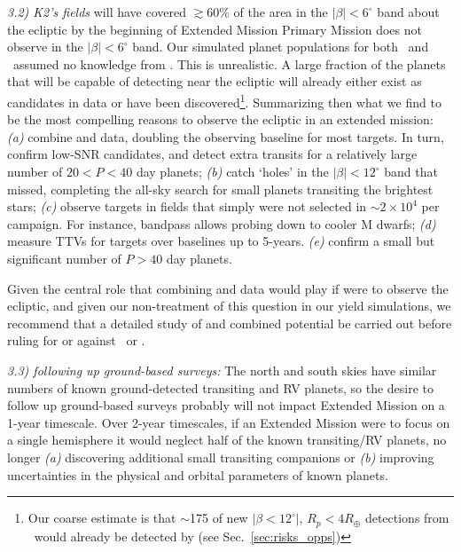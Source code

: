 \textit{3.2) K2's fields} will have covered $\gtrsim\!60\%$ of the area in the $|\beta|<6^\circ$ band about the ecliptic by the beginning of \tesss Extended Mission %
\tesss Primary Mission does not observe in the $|\beta|<6^\circ$ band. 
Our simulated planet populations for both \elong\ and \eshort\ assumed no knowledge from \ktwo\!.
This is unrealistic.
A large fraction of the planets that \tess will be capable of detecting near the ecliptic will already either exist as candidates in \ktwos data or have been discovered\footnote{Our coarse estimate is that $\sim$175 of  new $|\beta<12^\circ|$, $R_p<4R_\oplus$ detections from \elong\ would already be detected by \ktwo (see Sec.~\protect\ref{sec:risks_opps})}.
Summarizing then what we find to be the most compelling reasons to observe the ecliptic in an extended \tess mission:
\textit{(a)} combine \tess and \ktwo data, doubling the \ktwo observing baseline for most targets. In turn, confirm low-SNR candidates, and detect extra transits for a relatively large number of $20<P<40$ day planets;
\textit{(b)} catch `holes' in the $|\beta| < 12^\circ$ band that \ktwo missed, completing the all-sky search for small planets transiting the brightest stars;
\textit{(c)} observe targets in \ktwo fields that simply were not selected in \ktwos $\sim\!2\times10^4$ per campaign. For instance, \tesss bandpass allows probing down to cooler M dwarfs;
\textit{(d)} measure TTVs for targets over baselines up to 5-years.
\textit{(e)} confirm a small but significant number of $P>40$ day planets.

Given the central role that combining \tess and \ktwo data would play if \tess were to observe the ecliptic, and given our non-treatment of this question in our yield simulations, we recommend that a detailed study of \ktwo and \tesss combined potential be carried out before ruling for or against \elong\ or \eshort.

\textit{3.3) \tess following up ground-based surveys:}
The north and south skies have similar numbers of known ground-detected transiting and RV planets, so the desire to follow up ground-based surveys probably will not impact \tesss Extended Mission on a 1-year timescale.
Over 2-year timescales, if an Extended Mission were to focus on a single hemisphere it would neglect half of the known transiting/RV planets, no longer \textit{(a)} discovering additional small transiting companions %
or \textit{(b)} improving uncertainties in the physical and orbital parameters of known planets.


